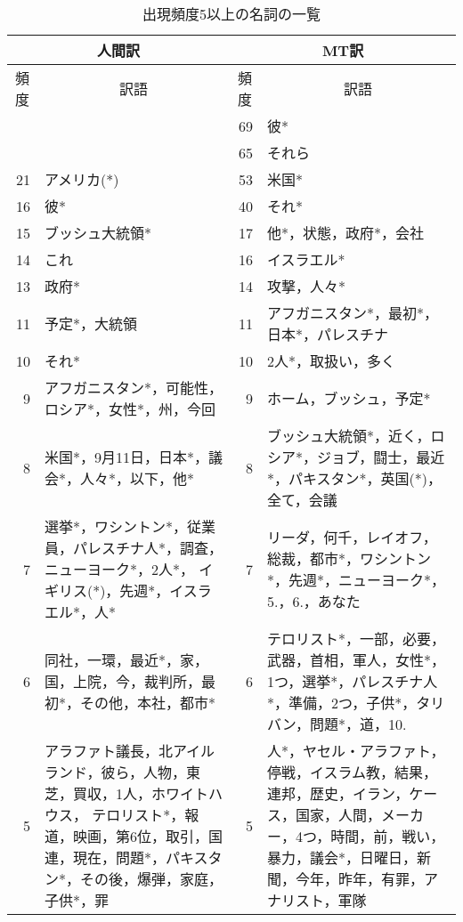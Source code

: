 \begin{table}[htbp]
\caption{出現頻度5以上の名詞の一覧}
\label{tab:hifreq-noun}
\begin{center}
\begin{tabular}{|r|p{}||r|p{}|}\hline
\multicolumn{2}{|c||}{人間訳} & \multicolumn{2}{c|}{MT訳} \\\hline\hline
\multicolumn{1}{|c}{頻度} & \multicolumn{1}{|c||}{訳語} & 
\multicolumn{1}{c}{頻度} & \multicolumn{1}{|c|}{訳語} \\\hline
 & & 69 & 彼* \\
 & & 65 & それら \\
21 & アメリカ(*) & 53 & 米国* \\
16 & 彼* & 40 & それ* \\
15 & ブッシュ大統領* & 17 & 他*，状態，政府*，会社 \\
14 & これ & 16 & イスラエル* \\
13 & 政府* & 14 & 攻撃，人々* \\
11 & 予定*，大統領 & 11 & アフガニスタン*，最初*，日本*，パレスチナ \\
10 & それ* & 10 & 2人*，取扱い，多く \\
 9 & アフガニスタン*，可能性，ロシア*，女性*，州，今回& 9 & ホーム，ブッシュ，予定* \\
 8 & 米国*，9月11日，日本*，議会*，人々*，以下，他* & 
	8 & ブッシュ大統領*，近く，ロシア*，ジョブ，闘士，最近*，パキスタン*，英国(*)，全て，会議 \\
 7 & 選挙*，ワシントン*，従業員，パレスチナ人*，調査，ニューヨーク*，2人*，
イギリス(*)，先週*，イスラエル*，人* &  
	7 & リーダ，何千，レイオフ，総裁，都市*，ワシントン*，先週*，ニューヨーク*，5.，6.，あなた \\ 
 6 & 同社，一環，最近*，家，国，上院，今，裁判所，最初*，その他，本社，都市* & 
	6 & テロリスト*，一部，必要，武器，首相，軍人，女性*，1つ，選挙*，パレスチナ人*，準備，2つ，子供*，タリバン，問題*，道，10. \\ 
 5 & アラファト議長，北アイルランド，彼ら，人物，東芝，買収，1人，ホワイトハウス，
テロリスト*，報道，映画，第6位，取引，国連，現在，問題*，パキスタン*，その後，爆弾，家庭，子供*，罪 &
	5 & 人*，ヤセル・アラファト，停戦，イスラム教，結果，連邦，歴史，イラン，ケース，国家，人間，メーカー，4つ，時間，前，戦い，暴力，議会*，日曜日，新聞，今年，昨年，有罪，アナリスト，軍隊 \\\hline
\end{tabular}
\end{center}
\end{table}


